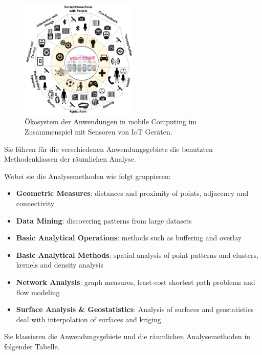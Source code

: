 \documentclass[
  11pt,
  a4paper,
  oneside, openany  ,captions=tableheading
]{scrbook}
\providecommand{\tightlist}{%
  \setlength{\itemsep}{0pt}\setlength{\parskip}{0pt}}
\theoremstyle{remark}
\begin{document}
\begin{figure}[H]

{\centering \includegraphics[width=0.5\textwidth,height=\textheight]{images/iot_ecosystem_mobile.png}

}

\caption{Ökosystem der Anwendungen in mobile Computing im Zusammenspiel
mit Sensoren von IoT Geräten.}

\end{figure}%

Sie führen für die verschiedenen Anwendungsgebiete die benutzten
Methodenklassen der räumlichen Analyse.

Wobei sie die Analysemethoden wie folgt gruppieren:

\begin{itemize}
\tightlist
\item
  \textbf{Geometric Measures}: distances and proximity of points,
  adjacency and connectivity
\item
  \textbf{Data Mining}: discovering patterns from large datasets
\item
  \textbf{Basic Analytical Operations}: methods such as buffering and
  overlay
\item
  \textbf{Basic Analytical Methods}: spatial analysis of point patterns
  and clusters, kernels and density analysis
\item
  \textbf{Network Analysis}: graph measures, least-cost shortest path
  problems and flow modeling
\item
  \textbf{Surface Analysis \& Geostatistics}: Analysis of surfaces and
  geostatistics deal with interpolation of surfaces and kriging.
\end{itemize}

Sie klassieren die Anwendungsgebiete und die räumlichen Analysemethoden
in folgender Tabelle.
\end{document}
